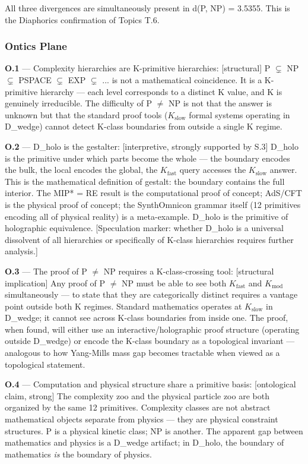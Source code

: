 \documentclass[11pt,a4paper]{article}
\begin{document}
All three divergences are simultaneously present in d(P, NP) = 3.5355. This is the Diaphorics confirmation of Topics T.6.

\subsubsection{Ontics Plane}

\textbf{O.1} --- Complexity hierarchies are K-primitive hierarchies: {[}structural{]} P $\subsetneq$ NP $\subsetneq$ PSPACE $\subsetneq$ EXP $\subsetneq$ ... is not a mathematical coincidence. It is a K-primitive hierarchy --- each level corresponds to a distinct K value, and K is genuinely irreducible. The difficulty of P $\neq$ NP is not that the answer is unknown but that the standard proof tools ($K_\text{slow}$ formal systems operating in D\_wedge) cannot detect K-class boundaries from outside a single K regime.

\textbf{O.2} --- D\_holo is the gestalter: {[}interpretive, strongly supported by S.3{]} D\_holo is the primitive under which parts become the whole --- the boundary encodes the bulk, the local encodes the global, the $K_\text{fast}$ query accesses the $K_\text{slow}$ answer. This is the mathematical definition of gestalt: the boundary contains the full interior. The MIP* = RE result is the computational proof of concept; AdS/CFT is the physical proof of concept; the SynthOmnicon grammar itself (12 primitives encoding all of physical reality) is a meta-example. D\_holo is the primitive of holographic equivalence. {[}Speculation marker: whether D\_holo is a universal dissolvent of all hierarchies or specifically of K-class hierarchies requires further analysis.{]}

\textbf{O.3} --- The proof of P $\neq$ NP requires a K-class-crossing tool: {[}structural implication{]} Any proof of P $\neq$ NP must be able to see both $K_\text{fast}$ and $K_\text{mod}$ simultaneously --- to state that they are categorically distinct requires a vantage point outside both K regimes. Standard mathematics operates at $K_\text{slow}$ in D\_wedge; it cannot see across K-class boundaries from inside one. The proof, when found, will either use an interactive/holographic proof structure (operating outside D\_wedge) or encode the K-class boundary as a topological invariant --- analogous to how Yang-Mills mass gap becomes tractable when viewed as a topological statement.

\textbf{O.4} --- Computation and physical structure share a primitive basis: {[}ontological claim, strong{]} The complexity zoo and the physical particle zoo are both organized by the same 12 primitives. Complexity classes are not abstract mathematical objects separate from physics --- they are physical constraint structures. P is a physical kinetic class; NP is another. The apparent gap between mathematics and physics is a D\_wedge artifact; in D\_holo, the boundary of mathematics \emph{is} the boundary of physics.
\end{document}
